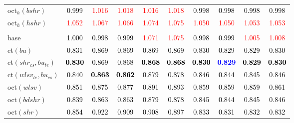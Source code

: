 \begin{tabular}[t]{l|ccccccccc}
oct$_h(bshr)$ & \textcolor{black}{0.999} & \textcolor{red}{1.016} & \textcolor{red}{1.018} & \textcolor{red}{1.016} & \textcolor{red}{1.018} & \textcolor{black}{0.998} & \textcolor{black}{0.998} & \textcolor{black}{0.998} & \textcolor{black}{0.998}\\
oct$_h(hshr)$ & \textcolor{red}{1.052} & \textcolor{red}{1.067} & \textcolor{red}{1.066} & \textcolor{red}{1.074} & \textcolor{red}{1.075} & \textcolor{red}{1.050} & \textcolor{red}{1.050} & \textcolor{red}{1.053} & \textcolor{red}{1.053}\\
\addlinespace[0.3em]
\multicolumn{10}{c}{\textbf{$k = 2$}}\\
base & \textcolor{black}{1.000} & \textcolor{black}{0.998} & \textcolor{black}{0.999} & \textcolor{red}{1.071} & \textcolor{red}{1.075} & \textcolor{black}{0.998} & \textcolor{black}{0.999} & \textcolor{red}{1.005} & \textcolor{red}{1.008}\\
ct$(bu)$ & \textcolor{black}{0.831} & \textcolor{black}{0.869} & \textcolor{black}{0.869} & \textcolor{black}{0.869} & \textcolor{black}{0.869} & \textcolor{black}{0.830} & \textcolor{black}{0.829} & \textcolor{black}{0.829} & \textcolor{black}{0.830}\\
ct$(shr_{cs}, bu_{te})$ & \textcolor{black}{\textbf{0.830}} & \textcolor{black}{0.869} & \textcolor{black}{0.868} & \textcolor{black}{\textbf{0.868}} & \textcolor{black}{\textbf{0.868}} & \textcolor{black}{\textbf{0.830}} & \textcolor{blue}{\textbf{0.829}} & \textcolor{black}{\textbf{0.829}} & \textcolor{black}{\textbf{0.830}}\\
ct$(wlsv_{te}, bu_{cs})$ & \textcolor{black}{0.840} & \textcolor{black}{\textbf{0.863}} & \textcolor{black}{\textbf{0.862}} & \textcolor{black}{0.879} & \textcolor{black}{0.878} & \textcolor{black}{0.846} & \textcolor{black}{0.844} & \textcolor{black}{0.845} & \textcolor{black}{0.846}\\
oct$(wlsv)$ & \textcolor{black}{0.851} & \textcolor{black}{0.875} & \textcolor{black}{0.877} & \textcolor{black}{0.891} & \textcolor{black}{0.893} & \textcolor{black}{0.859} & \textcolor{black}{0.859} & \textcolor{black}{0.859} & \textcolor{black}{0.861}\\
oct$(bdshr)$ & \textcolor{black}{0.839} & \textcolor{black}{0.863} & \textcolor{black}{0.863} & \textcolor{black}{0.879} & \textcolor{black}{0.878} & \textcolor{black}{0.845} & \textcolor{black}{0.844} & \textcolor{black}{0.845} & \textcolor{black}{0.846}\\
oct$(shr)$ & \textcolor{black}{0.854} & \textcolor{black}{0.922} & \textcolor{black}{0.909} & \textcolor{black}{0.908} & \textcolor{black}{0.897} & \textcolor{black}{0.833} & \textcolor{black}{0.831} & \textcolor{black}{0.832} & \textcolor{black}{0.832}\\

\end{tabular}
